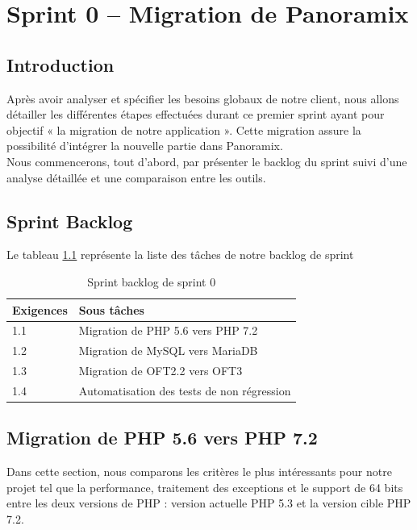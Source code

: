 \chapter{Sprint 0 – Migration de Panoramix}

\section*{Introduction}
Après avoir analyser et spécifier les besoins globaux de notre client, nous allons détailler les différentes étapes effectuées durant ce premier sprint ayant pour objectif « la migration de notre application ». Cette migration assure la possibilité d’intégrer la nouvelle partie dans Panoramix.\\
Nous commencerons, tout d’abord, par présenter le backlog du sprint suivi d’une analyse détaillée et une comparaison entre les outils.

\section[Sprint Backlog]{Sprint Backlog}
Le tableau \ref{tab:sprint-backlog-sprint0} représente la liste des tâches de notre backlog de sprint
\begin{table}[H]
	\centering
	\begin{tabular}{|l|l|}
		\hline
		\rowcolor[HTML]{C0C0C0} 
		Exigences & Sous tâches                           \\ \hline
		1.1      & Migration de PHP 5.6 vers PHP 7.2    \\ \hline
		1.2      & Migration de MySQL vers MariaDB      \\ \hline
		1.3      & Migration de OFT2.2 vers OFT3        \\ \hline
		1.4      & Automatisation des tests de non régression \\ \hline
	\end{tabular}
	\captionsetup{justification=centering}
	\caption{Sprint backlog de sprint 0}
	\label{tab:sprint-backlog-sprint0}
\end{table}

\section[Migration de PHP 5.6 vers PHP 7.2]{Migration de PHP 5.6 vers PHP 7.2}
Dans cette section, nous comparons les critères le plus intéressants pour notre projet tel que la performance, traitement des exceptions et le support de 64 bits entre les deux versions de PHP : version actuelle PHP 5.3 et la version cible PHP 7.2.

